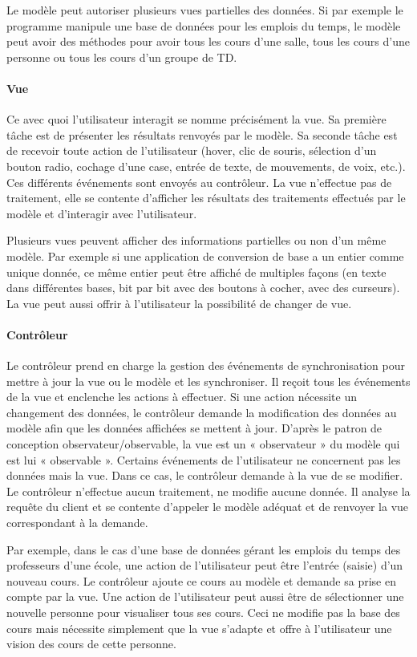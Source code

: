 \documentclass[a4paper,11pt,twoside]{report}
\begin{document}
  Le modèle peut autoriser plusieurs vues partielles des données. Si par exemple le programme manipule une base de données pour les emplois du temps, le modèle peut avoir des méthodes pour avoir tous les cours d'une salle, tous les cours d'une personne ou tous les cours d'un groupe de TD.

  \paragraph*{Vue}
  Ce avec quoi l'utilisateur interagit se nomme précisément la vue. Sa première tâche est de présenter les résultats renvoyés par le modèle. Sa seconde tâche est de recevoir toute action de l'utilisateur (hover, clic de souris, sélection d'un bouton radio, cochage d'une case, entrée de texte, de mouvements, de voix, etc.). Ces différents événements sont envoyés au contrôleur. La vue n'effectue pas de traitement, elle se contente d'afficher les résultats des traitements effectués par le modèle et d'interagir avec l'utilisateur.

  Plusieurs vues peuvent afficher des informations partielles ou non d'un même modèle. Par exemple si une application de conversion de base a un entier comme unique donnée, ce même entier peut être affiché de multiples façons (en texte dans différentes bases, bit par bit avec des boutons à cocher, avec des curseurs). La vue peut aussi offrir à l'utilisateur la possibilité de changer de vue.

  \paragraph*{Contrôleur}
  Le contrôleur prend en charge la gestion des événements de synchronisation pour mettre à jour la vue ou le modèle et les synchroniser. Il reçoit tous les événements de la vue et enclenche les actions à effectuer. Si une action nécessite un changement des données, le contrôleur demande la modification des données au modèle afin que les données affichées se mettent à jour. D'après le patron de conception observateur/observable, la vue est un « observateur » du modèle qui est lui « observable ». Certains événements de l'utilisateur ne concernent pas les données mais la vue. Dans ce cas, le contrôleur demande à la vue de se modifier. Le contrôleur n'effectue aucun traitement, ne modifie aucune donnée. Il analyse la requête du client et se contente d'appeler le modèle adéquat et de renvoyer la vue correspondant à la demande.

  Par exemple, dans le cas d'une base de données gérant les emplois du temps des professeurs d'une école, une action de l'utilisateur peut être l'entrée (saisie) d'un nouveau cours. Le contrôleur ajoute ce cours au modèle et demande sa prise en compte par la vue. Une action de l'utilisateur peut aussi être de sélectionner une nouvelle personne pour visualiser tous ses cours. Ceci ne modifie pas la base des cours mais nécessite simplement que la vue s'adapte et offre à l'utilisateur une vision des cours de cette personne.
  
\end{document}
